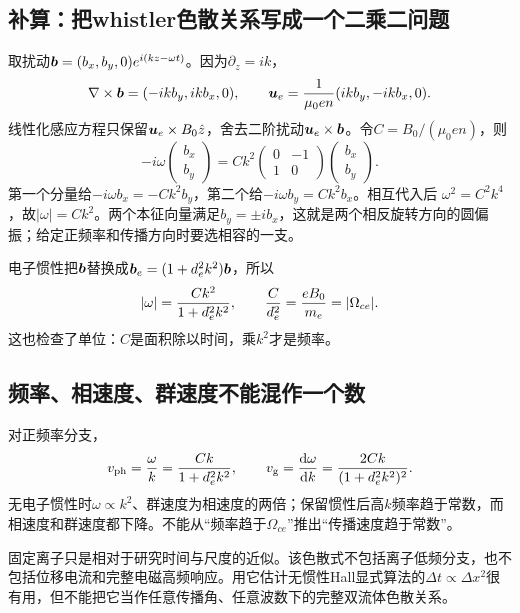 \documentclass[UTF8,a4paper,11pt,openany,fontset=fandol]{ctexbook}
\begin{document}
\subsection{补算：把whistler色散关系写成一个二乘二问题}
取扰动$\bm{b}=(b_x,b_y,0)e^{i(kz-\omega t)}$。因为$\partial_z=ik$，
\begin{equation}
 \nabla\times\bm{b}=(-ikb_y,ikb_x,0),\qquad
 \bm{u}_e={1\over\mu_0en}(ikb_y,-ikb_x,0).
\end{equation}
线性化感应方程只保留$\bm{u}_e\times B_0\hat z$，舍去二阶扰动$\bm{u}_e\times\bm{b}$。令$C=B_0/(\mu_0en)$，则
\begin{equation}
 -i\omega
 \begin{pmatrix}b_x\\b_y\end{pmatrix}
 =Ck^2
 \begin{pmatrix}0&-1\\1&0\end{pmatrix}
 \begin{pmatrix}b_x\\b_y\end{pmatrix}.
\end{equation}
第一个分量给$-i\omega b_x=-Ck^2b_y$，第二个给$-i\omega b_y=Ck^2b_x$。相互代入后
$\omega^2=C^2k^4$，故$|\omega|=Ck^2$。两个本征向量满足$b_y=\pm i b_x$，这就是两个相反旋转方向的圆偏振；给定正频率和传播方向时要选相容的一支。

电子惯性把$\bm{b}$替换成$\bm{b}_e=(1+d_e^2k^2)\bm{b}$，所以
\begin{equation}
 |\omega|={Ck^2\over1+d_e^2k^2},\qquad
 {C\over d_e^2}={eB_0\over m_e}=|\Omega_{ce}|.
\end{equation}
这也检查了单位：$C$是面积除以时间，乘$k^2$才是频率。

\subsection{频率、相速度、群速度不能混作一个数}
对正频率分支，
\begin{equation}
 v_{\rm ph}={\omega\over k}={Ck\over1+d_e^2k^2},\qquad
 v_{\rm g}={\mathrm d\omega\over\mathrm d k}
 ={2Ck\over(1+d_e^2k^2)^2}.
\end{equation}
无电子惯性时$\omega\propto k^2$、群速度为相速度的两倍；保留惯性后高$k$频率趋于常数，而相速度和群速度都下降。不能从“频率趋于$\Omega_{ce}$”推出“传播速度趋于常数”。

固定离子只是相对于研究时间与尺度的近似。该色散式不包括离子低频分支，也不包括位移电流和完整电磁高频响应。用它估计无惯性Hall显式算法的$\Delta t\propto\Delta x^2$很有用，但不能把它当作任意传播角、任意波数下的完整双流体色散关系。
\end{document}
